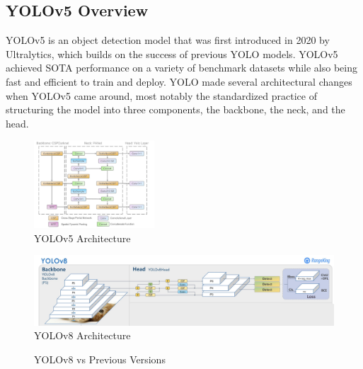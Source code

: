 \documentclass[10pt,twocolumn,letterpaper]{article}
\begin{document}
\subsection{YOLOv5 Overview}
YOLOv5 is an object detection model that was first introduced in 2020 by Ultralytics, which builds on the success of previous YOLO models. YOLOv5 achieved SOTA performance on a variety of benchmark datasets while also being fast and efficient to train and deploy. YOLO made several architectural changes when YOLOv5 came around, most notably the standardized practice of structuring the model into three components, the backbone, the neck, and the head.
\begin{figure}[h]
    \centering
    \includegraphics[width=0.4\textwidth]{figures/Yolov5Architecture.png}
    \caption{YOLOv5 Architecture \cite{Yolov5Arch}}
    \label{fig:Yolov5Architecture}
\end{figure}
\begin{figure}[h]
    \centering
    \includegraphics[width=1.0 \textwidth]{figures/YOLOv8_arch.png}
    \caption{YOLOv8 Architecture ~\cite{YOLOv8Website}}
    \label{fig:YOLOv8_arch}
\end{figure}
\begin{figure}[h]
    \centering
    \qquad
    \caption{YOLOv8 vs Previous Versions}%
    \label{fig:Model_Evaluation2}
\end{figure}
\end{document}
